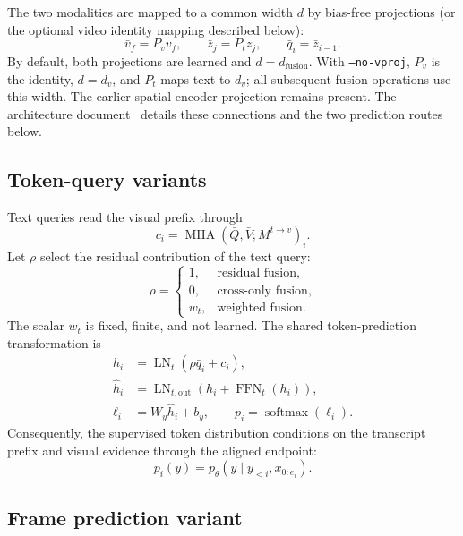 \documentclass[11pt,a4paper]{article}
\newcommand{\LN}{\operatorname{LN}}
\newcommand{\MHA}{\operatorname{MHA}}
\newcommand{\FFN}{\operatorname{FFN}}
\newcommand{\softmax}{\operatorname{softmax}}
\numberwithin{equation}{section}
\begin{document}
The two modalities are mapped to a common width $d$ by bias-free
projections (or the optional video identity mapping described below):
\begin{equation}
\bar v_f=P_vv_f,\qquad \bar z_j=P_tz_j,
\qquad \bar q_i=\bar z_{i-1}.
\label{eq:projections}
\end{equation}
By default, both projections are learned and $d=d_{\mathrm{fusion}}$.
With \texttt{--no-vproj}, $P_v$ is the identity, $d=d_v$, and $P_t$
maps text to $d_v$; all subsequent fusion operations use this width.
The earlier spatial encoder projection remains present. The architecture
document~\cite{architecture} details these connections and the two
prediction routes below.

\subsection{Token-query variants}

Text queries read the visual prefix through
\begin{equation}
c_i=\MHA(\bar Q,\bar V;M^{t\to v})_i.
\end{equation}
Let $\rho$ select the residual contribution of the text query:
\begin{equation}
\rho=
\begin{cases}
1,&\text{residual fusion},\\
0,&\text{cross-only fusion},\\
w_t,&\text{weighted fusion}.
\end{cases}
\end{equation}
The scalar $w_t$ is fixed, finite, and not learned. The shared
token-prediction transformation is
\begin{align}
h_i&=\LN_t(\rho\bar q_i+c_i),\\
\widehat h_i&=\LN_{t,\mathrm{out}}(h_i+\FFN_t(h_i)),\\
\ell_i&=W_y\widehat h_i+b_y,\qquad
p_i=\softmax(\ell_i).
\label{eq:token-head}
\end{align}
Consequently, the supervised token distribution conditions on the
transcript prefix and visual evidence through the aligned endpoint:
\begin{equation}
p_i(y)=p_\theta(y\mid y_{<i},x_{0:e_i}).
\end{equation}

\subsection{Frame prediction variant}
\end{document}
